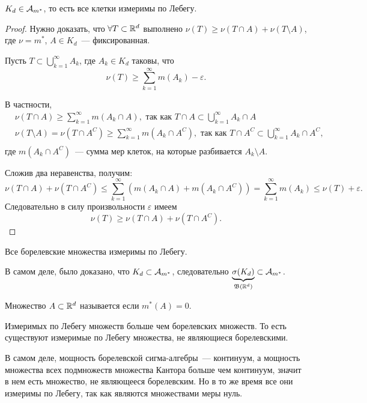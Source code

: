 \begin{claim}
    $K_d\in\mathcal{A}_{m^*}$, то есть все клетки измеримы по Лебегу.

    \begin{proof}
        Нужно доказать, что $\forall T\subset\mathbb{R}^d$ выполнено $\nu(T)\geqslant\nu(T\cap A)+\nu(T\setminus A)$, где
        $\nu=m^*$, $A\in K_d$~--- фиксированная.

        Пусть $T\subset\bigcup\limits_{k=1}^{\infty}A_k$, где $A_k\in K_d$ таковы, что
        \[
            \nu(T)\geqslant \sum_{k=1}^{\infty}m(A_k)-\varepsilon.
        \]

        В частности,
        \begin{align*}
             & \nu(T\cap A)\geqslant \sum_{k=1}^{\infty}m(A_k\cap A), \text{ так как } T\cap A\subset \bigcup_{k=1}^{\infty}A_k\cap A                            \\
             & \nu(T\setminus A)=\nu(T\cap A^C)\geqslant \sum_{k=1}^{\infty}m(A_k\cap A^C), \text{ так как } T\cap A^C\subset \bigcup_{k=1}^{\infty}A_k\cap A^C, \\
        \end{align*}
        где $m(A_k\cap A^C)$~--- сумма мер клеток, на которые разбивается $A_k\setminus A$.

        Сложив два неравенства, получим:
        \[
            \nu(T\cap A)+\nu(T\cap A^C)\leqslant\sum_{k=1}^{\infty}\left(m(A_k\cap A)+m(A_k\cap A^C)\right)=
            \sum_{k=1}^{\infty}m(A_k)\leqslant \nu(T)+\varepsilon.
        \]
        Следовательно в силу произвольности $\varepsilon$ имеем
        \[
            \nu(T)\geqslant\nu(T\cap A)+\nu(T\cap A^C).
        \]

    \end{proof}
\end{claim}

\begin{next0}
    Все борелевские множества измеримы по Лебегу.

    В самом деле, было доказано, что $K_d\subset\mathcal{A}_{m^*}$, следовательно $\underbrace{\sigma(K_d)}_{\mathfrak{B}(\mathbb{R}^d)}\subset \mathcal{A}_{m^*}$.
\end{next0}

\begin{definition}
    Множество $A\subset\mathbb{R}^d$ называется  если $m^*(A)=0$.
\end{definition}

\begin{remark}
    Измеримых по Лебегу множеств больше чем борелевских множеств. То есть существуют измеримые по Лебегу множества, не являющиеся борелевскими.

    В самом деле, мощность борелевской сигма-алгебры~--- континуум, а мощность множества всех подмножеств множества Кантора больше чем континуум,
    значит в нем есть множество, не являющееся борелевским. Но в то же время все они измеримы по Лебегу, так как являются множествами меры нуль.
\end{remark}